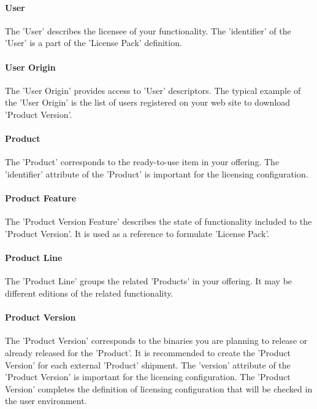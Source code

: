 \documentclass[12pt]{report}
\begin{document}
\paragraph*{User}

The 'User' describes the licensee of your functionality. The 'identifier' of the 'User' is a part of the 'License Pack' definition.

\paragraph*{User Origin}

The 'User Origin' provides access to 'User' descriptors. The typical example of the 'User Origin' is the list of users registered on your web site to download 'Product Version'.

\paragraph*{Product}

The 'Product' corresponds to the ready-to-use item in your offering. The 'identifier' attribute of the 'Product' is important for the licensing configuration. 

\paragraph*{Product Feature}

The 'Product Version Feature' describes the state of functionality included to the 'Product Version'. It is used as a reference to formulate 'License Pack'. 

\paragraph*{Product Line}

The 'Product Line' groups the related 'Products' in your offering. It may be different editions of the related functionality.

\paragraph*{Product Version}

The 'Product Version' corresponds to the binaries you are planning to release or already released for the 'Product'. It is recommended to create the 'Product Version' for each external 'Product' shipment. The 'version' attribute of the 'Product Version' is important for the licensing configuration. The 'Product Version' completes the definition of licensing configuration that will be checked in the user environment. 
\end{document}
